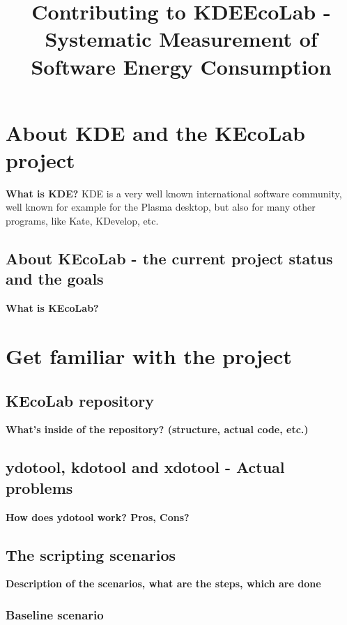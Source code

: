 \documentclass{article}
\title{Contributing to KDEEcoLab - Systematic Measurement of Software Energy Consumption}
\begin{document}
    \maketitle
    \newpage

    \tableofcontents

    \newpage

    \section{About KDE and the KEcoLab project}
        \textbf{What is KDE?}
        \newline
        KDE is a very well known international software community, well known for example for the Plasma desktop, but also for many other programs, like Kate, KDevelop, etc.

        \subsection{About KEcoLab - the current project status and the goals}
        \textbf{What is KEcoLab?}

    \section{Get familiar with the project}

        \subsection{KEcoLab repository}
        \textbf{What's inside of the repository? (structure, actual code, etc.)}

        \subsection{ydotool, kdotool and xdotool - Actual problems}
        \textbf{How does ydotool work? Pros, Cons?}

        \subsection{The scripting scenarios}
        \textbf{Description of the scenarios, what are the steps, which are done}

        \subsubsection{Baseline scenario}
\end{document}
